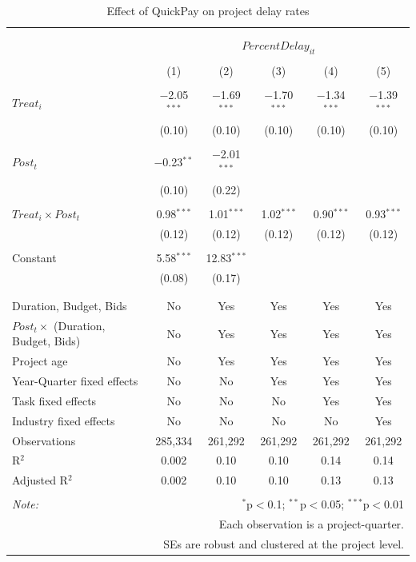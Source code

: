 \documentclass[
]{article}
\begin{document}
\begin{table}[H] \centering 
  \caption{Effect of QuickPay on project delay rates} 
  \label{} 
\small 
\begin{tabular}{@{\extracolsep{-2pt}}lccccc} 
\\[-1.8ex]\hline 
\hline \\[-1.8ex] 
\\[-1.8ex] & \multicolumn{5}{c}{$PercentDelay_{it}$} \\ 
\\[-1.8ex] & (1) & (2) & (3) & (4) & (5)\\ 
\hline \\[-1.8ex] 
 $Treat_i$ & $-$2.05$^{***}$ & $-$1.69$^{***}$ & $-$1.70$^{***}$ & $-$1.34$^{***}$ & $-$1.39$^{***}$ \\ 
  & (0.10) & (0.10) & (0.10) & (0.10) & (0.10) \\ 
  & & & & & \\ 
 $Post_t$ & $-$0.23$^{**}$ & $-$2.01$^{***}$ &  &  &  \\ 
  & (0.10) & (0.22) &  &  &  \\ 
  & & & & & \\ 
 $Treat_i \times Post_t$ & 0.98$^{***}$ & 1.01$^{***}$ & 1.02$^{***}$ & 0.90$^{***}$ & 0.93$^{***}$ \\ 
  & (0.12) & (0.12) & (0.12) & (0.12) & (0.12) \\ 
  & & & & & \\ 
 Constant & 5.58$^{***}$ & 12.83$^{***}$ &  &  &  \\ 
  & (0.08) & (0.17) &  &  &  \\ 
  & & & & & \\ 
\hline \\[-1.8ex] 
Duration, Budget, Bids & No & Yes & Yes & Yes & Yes \\ 
$Post_t \times$  (Duration, Budget, Bids) & No & Yes & Yes & Yes & Yes \\ 
Project age & No & Yes & Yes & Yes & Yes \\ 
Year-Quarter fixed effects & No & No & Yes & Yes & Yes \\ 
Task fixed effects & No & No & No & Yes & Yes \\ 
Industry fixed effects & No & No & No & No & Yes \\ 
Observations & 285,334 & 261,292 & 261,292 & 261,292 & 261,292 \\ 
R$^{2}$ & 0.002 & 0.10 & 0.10 & 0.14 & 0.14 \\ 
Adjusted R$^{2}$ & 0.002 & 0.10 & 0.10 & 0.13 & 0.13 \\ 
\hline 
\hline \\[-1.8ex] 
\textit{Note:}  & \multicolumn{5}{r}{$^{*}$p$<$0.1; $^{**}$p$<$0.05; $^{***}$p$<$0.01} \\ 
 & \multicolumn{5}{r}{Each observation is a project-quarter.} \\ 
 & \multicolumn{5}{r}{SEs are robust and clustered at the project level.} \\ 
\end{tabular} 
\end{table}
\end{document}
